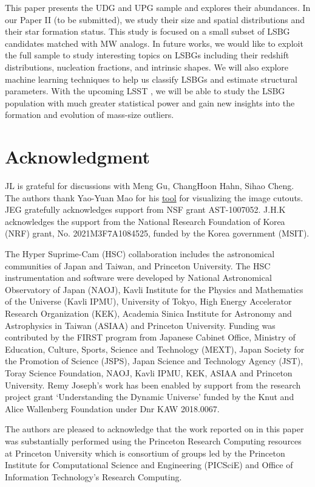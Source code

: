 \documentclass[twocolumn,astrosymb,twocolappendix]{aastex631}
\begin{document}
\begin{CJK*}{UTF8}{gbsn}
This paper presents the UDG and UPG sample and explores their abundances. In our Paper II (to be submitted), we study their size and spatial distributions and their star formation status. This study is focused on a small subset of LSBG candidates matched with MW analogs. In future works, we would like to exploit the full sample to study interesting topics on LSBGs including their redshift distributions, nucleation fractions, and intrinsic shapes. We will also explore machine learning techniques to help us classify LSBGs and estimate structural parameters. With the upcoming LSST \citep{lsst2009,LSST2019}, we will be able to study the LSBG population with much greater statistical power and gain new insights into the formation and evolution of mass-size outliers. 

\section*{Acknowledgment}
JL is grateful for discussions with Meng Gu, ChangHoon Hahn, Sihao Cheng. The authors thank Yao-Yuan Mao for his \href{https://github.com/yymao/decals-image-list-tool}{tool} for visualizing the image cutouts. JEG gratefully acknowledges support from NSF grant AST-1007052. J.H.K acknowledges the support from the National Research Foundation of Korea (NRF) grant, No. 2021M3F7A1084525, funded by the Korea government (MSIT).

The Hyper Suprime-Cam (HSC) collaboration includes the astronomical communities of Japan and Taiwan, and Princeton University. The HSC instrumentation and software were developed by National Astronomical Observatory of Japan (NAOJ), Kavli Institute for the Physics and Mathematics of the Universe (Kavli IPMU), University of Tokyo, High Energy Accelerator Research Organization (KEK), Academia Sinica Institute for Astronomy and Astrophysics in Taiwan (ASIAA) and Princeton University.  
Funding was contributed by the FIRST program from Japanese Cabinet Office, Ministry of Education, Culture, Sports, Science and Technology (MEXT), Japan Society for the Promotion of Science (JSPS), Japan Science and Technology Agency (JST), Toray Science Foundation, NAOJ, Kavli IPMU, KEK, ASIAA and Princeton University. Remy Joseph's work has been enabled by support from the research project grant ‘Understanding the Dynamic Universe’ funded by the Knut and Alice Wallenberg Foundation under Dnr KAW 2018.0067.

The authors are pleased to acknowledge that the work reported on in this paper was substantially performed using the Princeton Research Computing resources at Princeton University which is consortium of groups led by the Princeton Institute for Computational Science and Engineering (PICSciE) and Office of Information Technology's Research Computing.


\end{CJK*}
\end{document}

